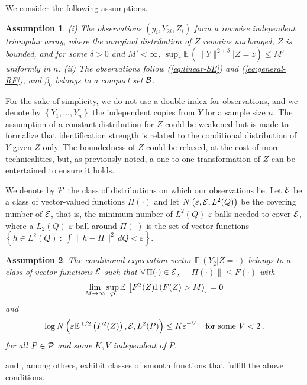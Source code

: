 \documentclass[12pt]{article}
\newcommand{\E}{\operatorname{E}}
\newcommand{\1}{\mathbf{1}}
\def\E{\mathbb{E}\,}
\newtheorem{hp}{Assumption}
\def\ind{\mathbb{I}}
\begin{document}
We consider the following assumptions.
\begin{hp}
\label{ass:iid}
(i) The observations $(y_{i}, Y_{2i}, Z_{i})$ form a rowwise
 independent triangular array, where the  marginal  distribution of
 $Z$   remains unchanged, $Z$ is bounded, and
 for some $\delta > 0$ and $M' < \infty$,
$\sup_{z} \E \left( \|Y\|^{2+\delta} | Z=z\right) \leq M' $  uniformly
 in $n$.
(ii) The observations follow (\ref{eq:linear-SE}) and
 (\ref{eq:general-RF}), and $\beta_0$ belongs to a compact set ${\cal B}$.
\end{hp}
For the sake of simplicity, we do not use a double index for observations, and we
denote by $\left\{Y_{1}, \ldots , Y_{n}\right\}$ the independent copies
from $Y$ for a sample size $n$.
The assumption of a constant distribution for $Z$ could be weakened
but is made to formalize that identification strength is related to
the conditional distribution of $Y$ given $Z$ only.
The boundedness of $Z$ could be relaxed, at the cost of more
technicalities, but, as previously noted, a one-to-one transformation
of $Z$ can be entertained to ensure it holds.

We denote by ${\cal P}$ the class of
distributions on which our observations lie.
Let ${\cal E}$ be a class of vector-valued functions $\Pi(\cdot)$ and let $N \left(
\varepsilon,{\cal E}, L^{2} (Q)\right)$ be the covering number of
${\cal E}$, that is, the minimum number of $L^{2} (Q)$
$\varepsilon$-balls needed to cover ${\cal E}$, where a $L_{2} (Q)$
$\varepsilon$-ball around  $\Pi(\cdot)$ is the set of vector functions
$\left\{ h \in L^{2} (Q) \ : \ \int_{}^{}{ \|h-\Pi\|^{2} \, dQ } < \varepsilon \right\}$.
\begin{hp}
\label{ass:pi}
The conditional expectation vector $\E \left( Y_{2} | Z=\cdot\right)$ belongs
to a class of vector functions  ${\cal E}$  such that
$\forall \, \Pi(\cdot) \in {\cal E}$, $\| \Pi(\cdot) \| \leq F(\cdot)$ with
\[
\lim_{M \rightarrow \infty} \sup_{\cal P}
\E \left[  F^{2} (Z) \ind\left( F (Z) > M \right)  \right] = 0
\]
 and
\[
\log N \left( \varepsilon \E^{1/2} \left( F^{2} (Z)\right), {\cal E}, L^{2} (P) \right) \leq K
\varepsilon^{-V} \quad \mbox{for some } V < 2 \, ,
\]
for all $P \in {\cal P}$ and  some $K,V$  independent of $P$.
\end{hp}
\cite{AndrewsHB} and \cite{van_der_vaart_bracketing_1994}, among
others, exhibit classes of smooth
functions that fulfill the above conditions.
\end{document}
